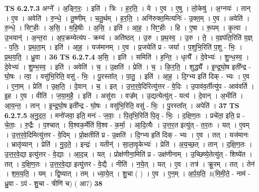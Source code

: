 \documentclass[17pt]{extarticle}
\begin{document}
                  \newline
                                \textbf{ TS 6.2.7.3} \newline
                  अग्ने᳚ । अ॒ङ्गि॒रः॒ । इति॑ । त्रिः । ह॒र॒ति॒ । ये । ए॒व । ए॒षु । लो॒केषु॑ । अ॒ग्नयः॑ । तान् । ए॒व । अवेति॑ । रु॒न्धे॒ । तू॒ष्णीम् । च॒तु॒र्थम् । ह॒र॒ति॒ । अनि॑रुक्त॒मित्यनिः॑ - उ॒क्त॒म् । ए॒व । अवेति॑ । रु॒न्धे॒ । सिꣳ॒॒हीः । अ॒सि॒ । म॒हि॒षीः । अ॒सि॒ । इति॑ । आ॒ह॒ । सिꣳ॒॒हीः । हि । ए॒षा । रू॒पम् । कृ॒त्वा । उ॒भयान्॑ । अ॒न्त॒रा । अ॒प॒क्रम्येत्य॑प - क्रम्य॑ । अति॑ष्ठत् । उ॒रु । प्र॒थ॒स्व॒ । उ॒रु । ते॒ । य॒ज्ञ्प॑ति॒रिति॑ य॒ज्ञ् - प॒तिः॒ । प्र॒थ॒ता॒म् । इति॑ । आ॒ह॒ । यज॑मानम् । ए॒व । प्र॒जयेति॑ प्र - जया᳚ । प॒शुभि॒रिति॑ प॒शु - भिः॒ । प्र॒थ॒य॒ति॒ । ध्रु॒वा । \textbf{  36} \newline
                  \newline
                                \textbf{ TS 6.2.7.4} \newline
                  अ॒सि॒ । इति॑ । समिति॑ । ह॒न्ति॒ । धृत्यै᳚ । दे॒वेभ्यः॑ । शु॒न्ध॒स्व॒ । दे॒वेभ्यः॑ । शु॒म्भ॒स्व॒ । इति॑ । अवेति॑ । च॒ । उ॒क्षति॑ । प्रेति॑ । च॒ । कि॒र॒ति॒ । शुद्ध्यै᳚ । इ॒न्द्र॒घो॒ष इती᳚न्द्र - घो॒षः । त्वा॒ । वसु॑भि॒रिति॒ वसु॑ - भिः॒ । पु॒रस्ता᳚त् । पा॒तु॒ । इति॑ । आ॒ह॒ । दि॒ग्भ्य इति॑ दिक् - भ्यः । ए॒व । ए॒ना॒म् । प्रेति॑ । उ॒क्ष॒ति॒ । दे॒वान् । च॒ । इत् । उ॒त्त॒र॒वे॒दिरित्यु॑त्तर - वे॒दिः । उ॒पाव॑व॒र्तीत्यु॑प - आव॑वर्ति । इ॒ह । ए॒व । वीति॑ । ज॒या॒म॒है॒ । इति॑ । असु॑राः । वज्र᳚म् । उ॒द्यत्येत्यु॑त् - यत्य॑ । दे॒वान् । अ॒भीति॑ । आ॒य॒न्त॒ । तान् । इ॒न्द्र॒घो॒ष इती᳚न्द्र - घो॒षः । वसु॑भि॒रिति॒ वसु॑ - भिः॒ । पु॒रस्ता᳚त् । अपेति॑ । \textbf{  37} \newline
                  \newline
                                \textbf{ TS 6.2.7.5} \newline
                  अ॒नु॒द॒त॒ । मनो॑जवा॒ इति॒ मनः॑ - ज॒वाः॒ । पि॒तृभि॒रिति॑ पि॒तृ - भिः॒ । द॒क्षि॒ण॒तः । प्रचे॑ता॒ इति॒ प्र - चे॒ताः॒ । रु॒द्रैः । प॒श्चात् । वि॒श्वक॒र्मेति॑ वि॒श्व - क॒र्मा॒ । आ॒दि॒त्यैः । उ॒त्त॒र॒त इत्यु॑त् - त॒र॒तः । यत् । ए॒वम् । उ॒त्त॒र॒वे॒दिमित्यु॑त्तर - वे॒दिम् । प्रो॒क्षतीति॑ प्र - उ॒क्षति॑ । दि॒ग्भ्य इति॑ दिक् - भ्यः । ए॒व । तत् । यज॑मानः । भ्रातृ॑व्यान् । प्रेति॑ । नु॒द॒ते॒ । इन्द्रः॑ । यतीन्॑ । सा॒ला॒वृ॒केभ्यः॑ । प्रेति॑ । अ॒य॒च्छ॒त् । तान् । द॒क्षि॒ण॒तः । उ॒त्त॒र॒वे॒द्या इत्यु॑त्तर - वे॒द्याः । आ॒द॒न्न् । यत् । प्रोक्ष॑णीना॒मिति॑ प्र - उक्ष॑णीनाम् । उ॒च्छिष्ये॒तेत्यु॑त् - शिष्ये॑त । तत् । द॒क्षि॒ण॒तः । उ॒त्त॒र॒वे॒द्या इत्यु॑त्तर - वे॒द्यै । नीति॑ । न॒ये॒त् । यत् । ए॒व । तत्र॑ । क्रू॒रम् । तत् । तेन॑ । श॒म॒य॒ति॒ । यम् । द्वि॒ष्यात् । तम् । ध्या॒ये॒त् । शु॒चा ( ) । ए॒व । ए॒न॒म् । अ॒र्प॒य॒ति॒ ॥(मि॒मी॒ते॒ - नाम॑ - ध्रु॒वा - ऽप॑ - शु॒चा - त्रीणि॑ च) ( आ7) \textbf{  38} \newline
\end{document}
